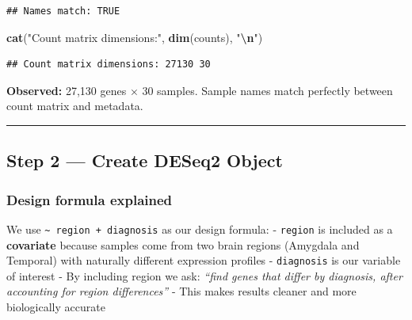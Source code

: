 \documentclass[
]{article}
\newenvironment{Shaded}{\begin{snugshade}}{\end{snugshade}}
\newcommand{\FunctionTok}[1]{\textcolor[rgb]{0.13,0.29,0.53}{\textbf{#1}}}
\newcommand{\NormalTok}[1]{#1}
\newcommand{\SpecialCharTok}[1]{\textcolor[rgb]{0.81,0.36,0.00}{\textbf{#1}}}
\newcommand{\StringTok}[1]{\textcolor[rgb]{0.31,0.60,0.02}{#1}}
\begin{document}
\begin{verbatim}
## Names match: TRUE
\end{verbatim}

\begin{Shaded}
\begin{Highlighting}[]
\FunctionTok{cat}\NormalTok{(}\StringTok{"Count matrix dimensions:"}\NormalTok{, }\FunctionTok{dim}\NormalTok{(counts), }\StringTok{"}\SpecialCharTok{\textbackslash{}n}\StringTok{"}\NormalTok{)}
\end{Highlighting}
\end{Shaded}

\begin{verbatim}
## Count matrix dimensions: 27130 30
\end{verbatim}

\textbf{Observed:} 27,130 genes × 30 samples. Sample names match
perfectly between count matrix and metadata.

\begin{center}\rule{0.5\linewidth}{0.5pt}\end{center}

\subsection{Step 2 --- Create DESeq2
Object}\label{step-2-create-deseq2-object}

\subsubsection{Design formula explained}\label{design-formula-explained}

We use \texttt{\textasciitilde{}\ region\ +\ diagnosis} as our design
formula: - \texttt{region} is included as a \textbf{covariate} because
samples come from two brain regions (Amygdala and Temporal) with
naturally different expression profiles - \texttt{diagnosis} is our
variable of interest - By including region we ask: \emph{``find genes
that differ by diagnosis, after accounting for region differences''} -
This makes results cleaner and more biologically accurate
\end{document}
